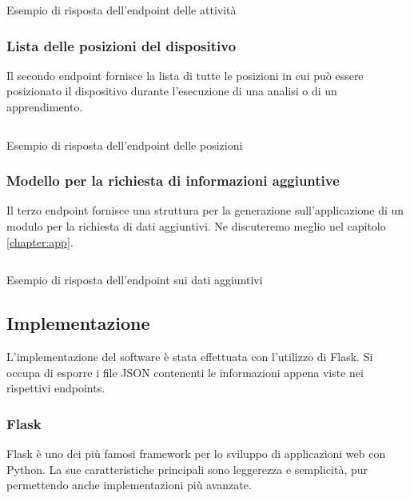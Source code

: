 \newpage
\begin{listing}[H] 
    \inputminted[frame=single,framesep=10pt]{json}{assets/snippets/server/api/activities.json}
    \caption{Esempio di risposta dell'endpoint delle attività}
    \label{listing:response-activities}
\end{listing}

\newpage
\subsubsection{Lista delle posizioni del dispositivo}
Il secondo endpoint fornisce la lista di tutte le posizioni in cui può essere posizionato il dispositivo durante l'esecuzione 
di una analisi o di un apprendimento.

\begin{listing}[H] 
    \inputminted[frame=single,framesep=10pt]{json}{assets/snippets/server/api/positions.json}
    \caption{Esempio di risposta dell'endpoint delle posizioni}
\end{listing}

\newpage
\subsubsection{Modello per la richiesta di informazioni aggiuntive}
Il terzo endpoint fornisce una struttura per la generazione sull'applicazione di un modulo per la richiesta di dati aggiuntivi. 
Ne discuteremo meglio nel capitolo \ref{chapter:app}.

\begin{listing}[H] 
    \inputminted[frame=single,framesep=10pt]{json}{assets/snippets/server/api/form.json}
    \caption{Esempio di risposta dell'endpoint sui dati aggiuntivi}
\end{listing}

\subsection{Implementazione}
L'implementazione del software è stata effettuata con l'utilizzo di Flask. Si occupa di esporre i 
file JSON contenenti le informazioni appena viste nei rispettivi endpoints.

\subsubsection{Flask}
Flask \cite{flask} è uno dei più famosi framework per lo sviluppo di applicazioni web 
con Python. La sue caratteristiche principali sono leggerezza e semplicità, pur permettendo anche implementazioni 
più avanzate.


